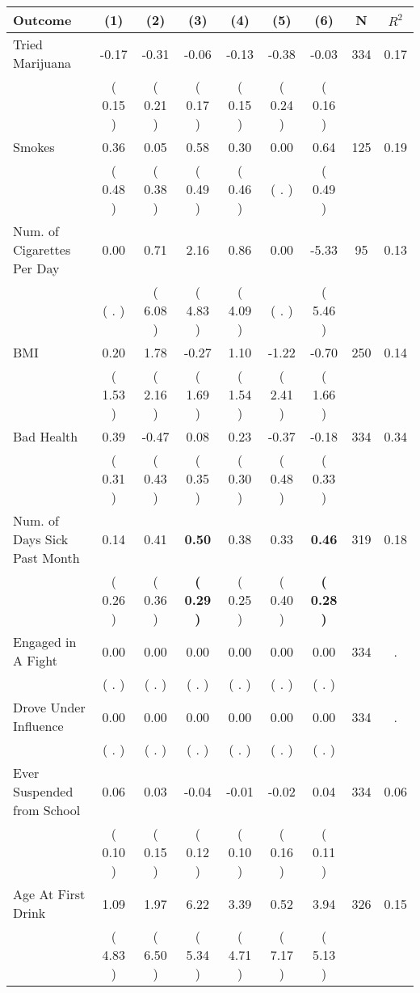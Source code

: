 \begin{tabular}{lcccccccc}
\toprule
 \textbf{Outcome} & \textbf{(1)} & \textbf{(2)} & \textbf{(3)} & \textbf{(4)} & \textbf{(5)} & \textbf{(6)} & \textbf{N} & \textbf{$ R^2$} \\
\midrule
Tried Marijuana &     -0.17 &     -0.31 &     -0.06 &     -0.13 &     -0.38 &     -0.03 & 334 &       0.17 \\ 
 & (     0.15 ) & (     0.21 ) & (     0.17 ) & (     0.15 ) & (     0.24 ) & (     0.16 ) & \\
Smokes &      0.36 &      0.05 &      0.58 &      0.30 &      0.00 &      0.64 & 125 &       0.19 \\ 
 & (     0.48 ) & (     0.38 ) & (     0.49 ) & (     0.46 ) & (        . ) & (     0.49 ) & \\
Num. of Cigarettes Per Day &      0.00 &      0.71 &      2.16 &      0.86 &      0.00 &     -5.33 & 95 &       0.13 \\ 
 & (        . ) & (     6.08 ) & (     4.83 ) & (     4.09 ) & (        . ) & (     5.46 ) & \\
BMI &      0.20 &      1.78 &     -0.27 &      1.10 &     -1.22 &     -0.70 & 250 &       0.14 \\ 
 & (     1.53 ) & (     2.16 ) & (     1.69 ) & (     1.54 ) & (     2.41 ) & (     1.66 ) & \\
Bad Health &      0.39 &     -0.47 &      0.08 &      0.23 &     -0.37 &     -0.18 & 334 &       0.34 \\ 
 & (     0.31 ) & (     0.43 ) & (     0.35 ) & (     0.30 ) & (     0.48 ) & (     0.33 ) & \\
Num. of Days Sick Past Month &      0.14 &      0.41 & \textbf{     0.50} &      0.38 &      0.33 & \textbf{     0.46} & 319 &       0.18 \\ 
 & (     0.26 ) & (     0.36 ) & \textbf{(     0.29 )} & (     0.25 ) & (     0.40 ) & \textbf{(     0.28 )} & \\
Engaged in A Fight &      0.00 &      0.00 &      0.00 &      0.00 &      0.00 &      0.00 & 334 &          . \\ 
 & (        . ) & (        . ) & (        . ) & (        . ) & (        . ) & (        . ) & \\
Drove Under Influence &      0.00 &      0.00 &      0.00 &      0.00 &      0.00 &      0.00 & 334 &          . \\ 
 & (        . ) & (        . ) & (        . ) & (        . ) & (        . ) & (        . ) & \\
Ever Suspended from School &      0.06 &      0.03 &     -0.04 &     -0.01 &     -0.02 &      0.04 & 334 &       0.06 \\ 
 & (     0.10 ) & (     0.15 ) & (     0.12 ) & (     0.10 ) & (     0.16 ) & (     0.11 ) & \\
Age At First Drink &      1.09 &      1.97 &      6.22 &      3.39 &      0.52 &      3.94 & 326 &       0.15 \\ 
 & (     4.83 ) & (     6.50 ) & (     5.34 ) & (     4.71 ) & (     7.17 ) & (     5.13 ) & \\
\bottomrule
\end{tabular}
